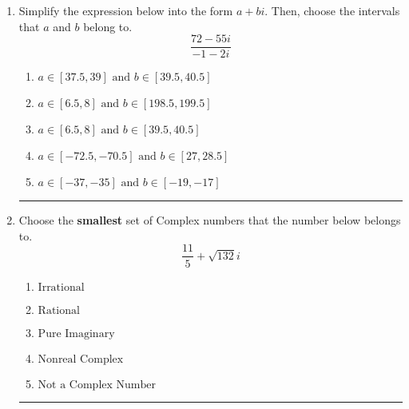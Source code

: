 \documentclass[14pt]{extbook}
\newcommand{\litem}[1]{\item#1\hspace*{-1cm}\rule{\textwidth}{0.4pt}}
\begin{document}
\begin{enumerate}
{\begin{enumerate}[label=\Alph*.]
\end{enumerate} }
\litem{
Simplify the expression below into the form $a+bi$. Then, choose the intervals that $a$ and $b$ belong to.\[ \frac{72 - 55 i}{-1 - 2 i} \]\begin{enumerate}[label=\Alph*.]
\item \( a \in [37.5, 39] \text{ and } b \in [39.5, 40.5] \)
\item \( a \in [6.5, 8] \text{ and } b \in [198.5, 199.5] \)
\item \( a \in [6.5, 8] \text{ and } b \in [39.5, 40.5] \)
\item \( a \in [-72.5, -70.5] \text{ and } b \in [27, 28.5] \)
\item \( a \in [-37, -35] \text{ and } b \in [-19, -17] \)

\end{enumerate} }
\litem{
Choose the \textbf{smallest} set of Complex numbers that the number below belongs to.\[ \frac{11}{5}+\sqrt{132} i \]\begin{enumerate}[label=\Alph*.]
\item \( \text{Irrational} \)
\item \( \text{Rational} \)
\item \( \text{Pure Imaginary} \)
\item \( \text{Nonreal Complex} \)
\item \( \text{Not a Complex Number} \)

\end{enumerate} }
\end{enumerate}
\end{document}
